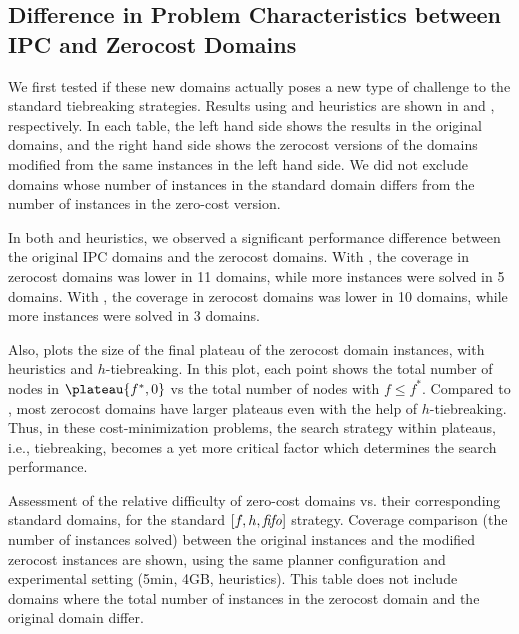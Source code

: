 \subsection{Difference in Problem Characteristics between IPC and Zerocost Domains}

We first tested if these new domains actually poses a new type of challenge to the
standard tiebreaking strategies. Results using \lmcut and \mands
heuristics are shown in  and
, respectively. In each table, the left
hand side shows the results in the original domains, and the right hand side
shows the zerocost versions of the domains modified from the same
instances in the left hand side. We did not exclude domains whose
number of instances in the standard domain differs from the number of instances in the zero-cost version.

In both \lmcut and \mands heuristics, we observed a significant
performance difference between the original IPC domains and the zerocost
domains. With \lmcut, the coverage in zerocost domains
was lower in 11 domains, while more instances were solved
in 5 domains. With \mands, the coverage in zerocost domains was lower in 10 domains, while
more instances were solved in 3 domains.

Also,  plots the size of the final plateau of the
zerocost domain instances, with \lmcut heuristics and $h$-tiebreaking. In this plot,
each point shows the total number of nodes in $\plateau{f^*,0}$ vs the
total number of nodes with $f\leq f^*$. Compared to ,
most zerocost domains have larger plateaus even with the help of
$h$-tiebreaking.  Thus, in these cost-minimization problems, the search
strategy within plateaus, i.e., tiebreaking, becomes a yet more critical
factor which determines the search performance.


\begin{table}[htbp]
 \centering
 
 \caption{
 Assessment of the relative difficulty of zero-cost domains vs. their corresponding standard domains, for the standard $[f,h,{\text{\textit{fifo}}}]$ strategy.
 Coverage comparison (the number of instances solved) 
 between the original instances and the modified zerocost instances are shown, 
 using the same planner configuration and experimental setting (5min, 4GB, \lmcut heuristics).
 This table does not include domains where the total number of instances
 in the zerocost domain  and the original domain differ. 
 }
 \label{tbl:lmcut-zerocost-std}
\end{table}

